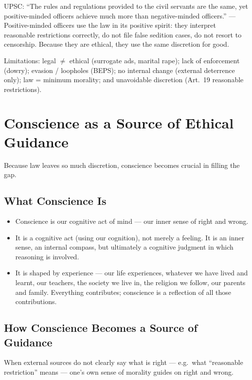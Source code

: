 \begin{PYQLink}
UPSC: ``The rules and regulations provided to the civil servants are the same, yet positive-minded officers achieve much more than negative-minded officers.'' --- Positive-minded officers use the law in its positive spirit: they interpret reasonable restrictions correctly, do not file false sedition cases, do not resort to censorship. Because they are ethical, they use the same discretion for good.
\end{PYQLink}

\begin{QuickRevision}
Limitations: legal $\neq$ ethical (surrogate ads, marital rape); lack of enforcement (dowry); evasion / loopholes (BEPS); no internal change (external deterrence only); law = minimum morality; and unavoidable discretion (Art.\ 19 reasonable restrictions).
\end{QuickRevision}

\section{Conscience as a Source of Ethical Guidance}
Because law leaves so much discretion, conscience becomes crucial in filling the gap.

\subsection{What Conscience Is}
\begin{KeyConcept}
\begin{itemize}
\item Conscience is our cognitive act of mind --- our inner sense of right and wrong.
\item It is a cognitive act (using our cognition), not merely a feeling. It is an inner sense, an internal compass, but ultimately a cognitive judgment in which reasoning is involved.
\item It is shaped by experience --- our life experiences, whatever we have lived and learnt, our teachers, the society we live in, the religion we follow, our parents and family. Everything contributes; conscience is a reflection of all those contributions.
\end{itemize}
\end{KeyConcept}

\subsection{How Conscience Becomes a Source of Guidance}
When external sources do not clearly say what is right --- e.g.\ what ``reasonable restriction'' means --- one's own sense of morality guides on right and wrong.


